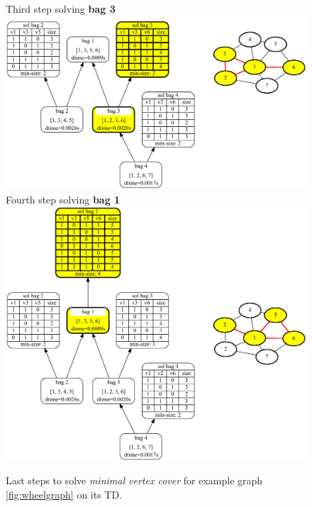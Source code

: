 \documentclass[a4paper, 12pt, bibliography=totoc]{scrartcl}
\begin{document}
\begin{figure}[H]
	\centering
	Third step solving \textbf{bag 3} \vspace{1em}\\
	
	\includegraphics[width=0.9\linewidth]{images/WheelGraph7/combined4.pdf}\\
	\vspace{0.5em}
	Fourth step solving \textbf{bag 1}\\
	
	\vspace{0.6em}
	\includegraphics[width=0.9\linewidth]{images/WheelGraph7/combined5.pdf}\\
	
	\caption{Last steps to solve \textit{minimal vertex cover} for example graph \ref{fig:wheelgraph} on its TD.}
	\label{fig:wheelgraphc45}
\end{figure}


\end{document}
